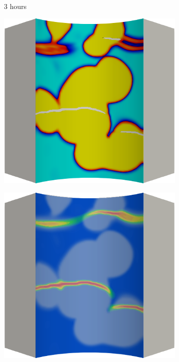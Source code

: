 \begin{figure}[!htbp]
  \begin{subfigure}{0.15\textwidth}
    \centering
    \caption*{3 hours}
  \end{subfigure}
  \begin{subfigure}{0.19\textwidth}
    \centering
    \includegraphics[width=\textwidth]{Chapter5/figures/spallation/c.0027}
  \end{subfigure}
  \hspace{0.06\textwidth}
  \begin{subfigure}{0.19\textwidth}
    \centering
    \includegraphics[width=\textwidth]{Chapter5/figures/spallation/d.0027}

\end{subfigure}
\end{figure}
